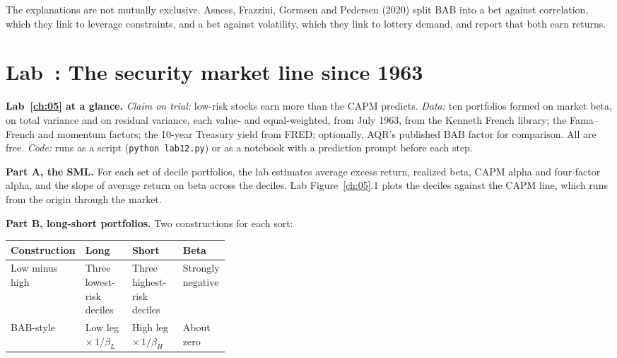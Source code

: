 The explanations are not mutually exclusive. Asness, Frazzini, Gormsen and Pedersen (2020) split BAB into a bet against correlation, which they link to leverage constraints, and a bet against volatility, which they link to lottery demand, and report that both earn returns.

\section{Lab~\thechapter: The security market line since 1963}
\label{sec:05-lab}

\begin{callout}
\textbf{Lab~\ref{ch:05} at a glance.} \emph{Claim on trial:} low-risk stocks earn more than the CAPM predicts. \emph{Data:} ten portfolios formed on market beta, on total variance and on residual variance, each value- and equal-weighted, from July 1963, from the Kenneth French library; the Fama--French and momentum factors; the 10-year Treasury yield from FRED; optionally, AQR's published BAB factor for comparison. All are free. \emph{Code:} runs as a script (\texttt{python lab12.py}) or as a notebook with a prediction prompt before each step.
\end{callout}

\textbf{Part A, the SML.} For each set of decile portfolios, the lab estimates average excess return, realized beta, CAPM alpha and four-factor alpha, and the slope of average return on beta across the deciles. Lab Figure~\ref{ch:05}.1 plots the deciles against the CAPM line, which runs from the origin through the market.

\textbf{Part B, long-short portfolios.} Two constructions for each sort:

\begin{center}
\small
\begin{tabularx}{0.9\linewidth}{@{}>{\raggedright\arraybackslash}p{0.19\linewidth}>{\raggedright\arraybackslash}X>{\raggedright\arraybackslash}X>{\raggedright\arraybackslash}p{0.17\linewidth}@{}}
\toprule
Construction & Long & Short & Beta \\
\midrule
Low minus high & Three lowest-risk deciles & Three highest-risk deciles & Strongly negative \\
BAB-style & Low leg $\times\, 1/\beta_L$ & High leg $\times\, 1/\beta_H$ & About zero \\
\bottomrule
\end{tabularx}
\end{center}

